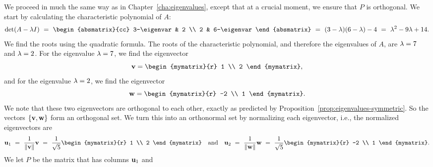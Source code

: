 \begin{solution}
  We proceed in much the same way as in Chapter~\ref{cha:eigenvalues},
  except that at a crucial moment, we ensure that $P$ is orthogonal.
  We start by calculating the characteristic polynomial of $A$:
  \begin{equation*}
    \det(A-\eigenvar I)
    ~=~ \begin{absmatrix}{cc}
      3-\eigenvar & 2 \\
      2 & 6-\eigenvar
    \end{absmatrix}
    ~=~ (3-\eigenvar)(6-\eigenvar) - 4
    ~=~ \eigenvar^2 - 9\eigenvar + 14.
  \end{equation*}
  We find the roots using the quadratic formula. The roots of the
  characteristic polynomial, and therefore the eigenvalues of $A$, are
  $\lambda=7$ and $\lambda=2$. For the eigenvalue $\lambda=7$,
  we find the eigenvector
  \begin{equation*}
    \vect{v} = \begin{mymatrix}{r} 1 \\ 2 \end{mymatrix},
  \end{equation*}
  and for the eigenvalue $\lambda=2$, we find the eigenvector
  \begin{equation*}
    \vect{w} = \begin{mymatrix}{r} -2 \\ 1 \end{mymatrix}.
  \end{equation*}
  We note that these two eigenvectors are orthogonal to each other,
  exactly as predicted by Proposition~\ref{prop:eigenvalues-symmetric}. So
  the vectors $\set{\vect{v},\vect{w}}$ form an orthogonal set. We
  turn this into an orthonormal set by normalizing each eigenvector,
  i.e., the normalized eigenvectors are
  \begin{equation*}
    \vect{u}_1
    ~=~ \frac{1}{\norm{\vect{v}}}\vect{v}
    ~=~ \frac{1}{\sqrt{5}} \begin{mymatrix}{r} 1 \\ 2 \end{mymatrix}
    \quad\mbox{and}\quad
    \vect{u}_2
    ~=~ \frac{1}{\norm{\vect{w}}}\vect{w}
    ~=~ \frac{1}{\sqrt{5}} \begin{mymatrix}{r} -2 \\ 1 \end{mymatrix}.
  \end{equation*}
  We let $P$ be the matrix that has columns $\vect{u}_1$ and

\end{solution}
